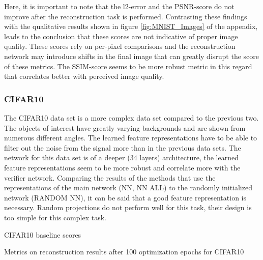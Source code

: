 Here, it is important to note that the l2-error and the PSNR-score do not improve after the reconstruction task is performed.
Contrasting these findings with the qualitative results shown in figure \ref{fig:MNIST_Images} of the appendix, 
leads to the conclusion that these scores are not indicative of proper image quality.
These scores rely on per-pixel comparisons and the reconstruction network may introduce shifts in the final image
that can greatly disrupt the score of these metrics.
The SSIM-score seems to be more robust metric in this regard that correlates better with perceived image quality.





\subsubsection{CIFAR10}

The CIFAR10 data set is a more complex data set compared to the previous two.
The objects of interest have greatly varying backgrounds and are shown from numerous different angles.
The learned feature representations have to be able to filter out the noise from the signal more than in
the previous data sets.
The network for this data set is of a deeper (34 layers) architecture,
the learned feature representations seem to be more robust and correlate more with the verifier network.
Comparing the results of the methods that use the representations of the main network (NN, NN ALL)
to the randomly initialized network (RANDOM NN), it can be said that a good feature representation is necessary.
Random projections do not perform well for this task, their design is too simple for this complex task.

\begin{table}[!htbp]
\label{tab:cifar10baseline}
\centering
\footnotesize
{}
\caption{CIFAR10 baseline scores}
\end{table}

\begin{table}[!htbp]
\label{tab:cifar10results}
\centering
\footnotesize
{}
\caption{Metrics on reconstruction results after 100 optimization epochs for CIFAR10}
\end{table}





